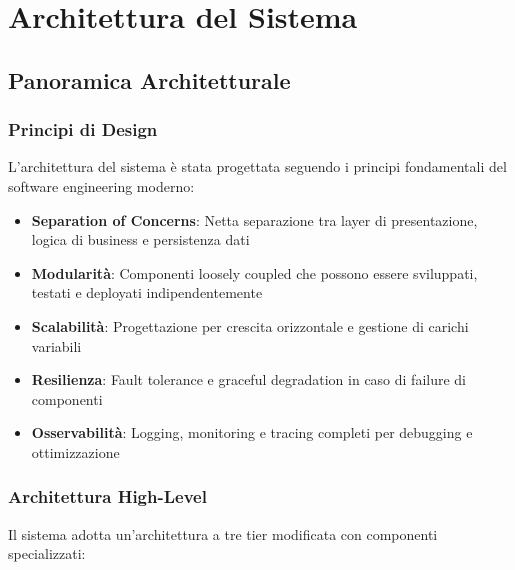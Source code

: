 \documentclass[12pt,a4paper]{report}
\begin{document}
\chapter{Architettura del Sistema}

\section{Panoramica Architetturale}

\subsection{Principi di Design}

L'architettura del sistema è stata progettata seguendo i principi fondamentali del software engineering moderno:

\begin{itemize}
    \item \textbf{Separation of Concerns}: Netta separazione tra layer di presentazione, logica di business e persistenza dati
    \item \textbf{Modularità}: Componenti loosely coupled che possono essere sviluppati, testati e deployati indipendentemente
    \item \textbf{Scalabilità}: Progettazione per crescita orizzontale e gestione di carichi variabili
    \item \textbf{Resilienza}: Fault tolerance e graceful degradation in caso di failure di componenti
    \item \textbf{Osservabilità}: Logging, monitoring e tracing completi per debugging e ottimizzazione
\end{itemize}

\subsection{Architettura High-Level}

Il sistema adotta un'architettura a tre tier modificata con componenti specializzati:
\end{document}
